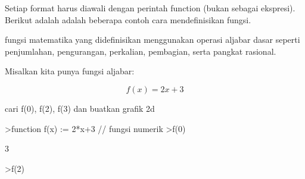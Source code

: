 \documentclass[a4paper,10pt]{article}
\begin{document}
\begin{eulernotebook}
\begin{eulercomment}
\begin{eulercomment}
\begin{eulercomment}
\begin{eulercomment}
\begin{eulercomment}
\begin{eulercomment}
\begin{eulercomment}
\begin{eulercomment}
\begin{eulercomment}
\begin{eulercomment}
\begin{eulercomment}
\begin{eulercomment}
\begin{eulercomment}
\begin{eulercomment}
\begin{eulercomment}
\begin{eulercomment}
\begin{eulercomment}
\begin{eulercomment}
\begin{eulercomment}
\begin{eulercomment}
\begin{eulercomment}
\begin{eulercomment}
\begin{eulercomment}
\begin{eulercomment}
\begin{eulercomment}
\begin{eulercomment}
\begin{eulercomment}
\begin{eulercomment}
\begin{eulercomment}
\begin{eulercomment}
\begin{eulercomment}
\begin{eulercomment}
\begin{eulercomment}
\begin{eulercomment}
\begin{eulercomment}
\begin{eulercomment}
\begin{eulercomment}
\begin{eulercomment}
\begin{eulercomment}
\begin{eulercomment}
\begin{eulercomment}
\begin{eulercomment}
\begin{eulercomment}
\begin{eulercomment}
\begin{eulercomment}
\begin{eulercomment}
\begin{eulercomment}
Setiap format harus diawali dengan perintah function (bukan sebagai
ekspresi).\\
Berikut adalah adalah beberapa contoh cara mendefinisikan fungsi.

\begin{eulercomment}
\begin{eulercomment}
fungsi matematika yang didefinisikan menggunakan operasi aljabar dasar
seperti penjumlahan, pengurangan, perkalian, pembagian, serta pangkat
rasional.


Misalkan kita punya fungsi aljabar:\\
\end{eulercomment}
\begin{eulerformula}
\[
f(x)=2x+3
\]
\end{eulerformula}
\begin{eulercomment}
cari f(0), f(2), f(3) dan buatkan grafik 2d
\end{eulercomment}
\begin{eulerprompt}
>function f(x) := 2*x+3 // fungsi numerik
>f(0)
\end{eulerprompt}
\begin{euleroutput}
  3
\end{euleroutput}
\begin{eulerprompt}
>f(2)
\end{eulerprompt}

\end{eulercomment}
\end{eulercomment}
\end{eulercomment}
\end{eulercomment}
\end{eulercomment}
\end{eulercomment}
\end{eulercomment}
\end{eulercomment}
\end{eulercomment}
\end{eulercomment}
\end{eulercomment}
\end{eulercomment}
\end{eulercomment}
\end{eulercomment}
\end{eulercomment}
\end{eulercomment}
\end{eulercomment}
\end{eulercomment}
\end{eulercomment}
\end{eulercomment}
\end{eulercomment}
\end{eulercomment}
\end{eulercomment}
\end{eulercomment}
\end{eulercomment}
\end{eulercomment}
\end{eulercomment}
\end{eulercomment}
\end{eulercomment}
\end{eulercomment}
\end{eulercomment}
\end{eulercomment}
\end{eulercomment}
\end{eulercomment}
\end{eulercomment}
\end{eulercomment}
\end{eulercomment}
\end{eulercomment}
\end{eulercomment}
\end{eulercomment}
\end{eulercomment}
\end{eulercomment}
\end{eulercomment}
\end{eulercomment}
\end{eulercomment}
\end{eulercomment}
\end{eulercomment}
\end{eulercomment}
\end{eulernotebook}
\end{document}
